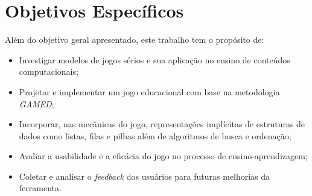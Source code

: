 \section{Objetivos Específicos}

Além do objetivo geral apresentado, este trabalho tem o propósito de:

\begin{itemize}
  \item Investigar modelos de jogos sérios e sua aplicação no ensino de conteúdos computacionais;
  \item Projetar e implementar um jogo educacional com base na metodologia \emph{GAMED};
  \item Incorporar, nas mecânicas do jogo, representações implícitas de estruturas de dados como listas, filas e pilhas além de algoritmos de busca e ordenação;
  \item Avaliar a usabilidade e a eficácia do jogo no processo de ensino-aprendizagem;
  \item Coletar e analisar o \emph{feedback} dos usuários para futuras melhorias da ferramenta.
\end{itemize}
